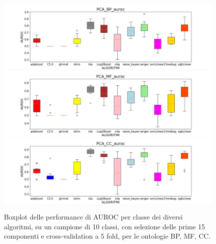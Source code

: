 \documentclass[12pt]{report}
\begin{document}
\begin{figure}[hp!]
\centering
\includegraphics[scale=0.37]{./images/PCA_BP_auroc.png}
\includegraphics[scale=0.37]{./images/PCA_MF_auroc.png}
\includegraphics[scale=0.37]{./images/PCA_CC_auroc.png}
\caption{\footnotesize{Boxplot delle performance di AUROC per classe dei diversi algoritmi, su un campione di 10 classi, con selezione delle prime 15 componenti e cross-validation a 5 fold, per le ontologie BP, MF, CC.}}
\label{BPboxplotpca5f}
\end{figure}
\end{document}
